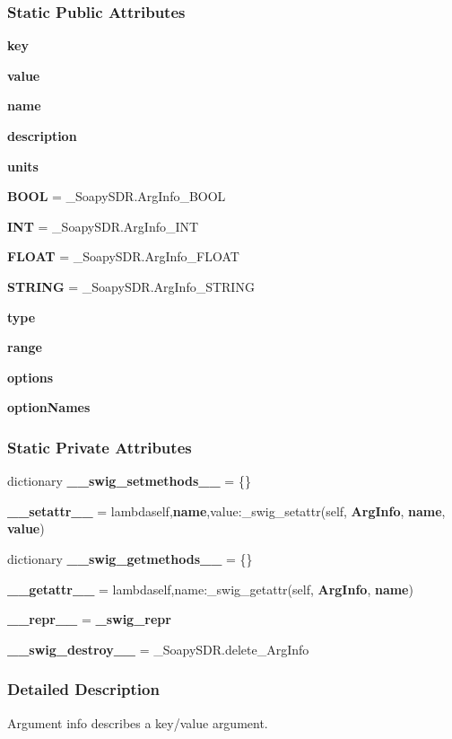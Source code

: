 \subsubsection*{Static Public Attributes}
\begin{DoxyCompactItemize}
\item 
{\bf key}
\item 
{\bf value}
\item 
{\bf name}
\item 
{\bf description}
\item 
{\bf units}
\item 
{\bf B\+O\+OL} = \+\_\+\+Soapy\+S\+D\+R.\+Arg\+Info\+\_\+\+B\+O\+OL
\item 
{\bf I\+NT} = \+\_\+\+Soapy\+S\+D\+R.\+Arg\+Info\+\_\+\+I\+NT
\item 
{\bf F\+L\+O\+AT} = \+\_\+\+Soapy\+S\+D\+R.\+Arg\+Info\+\_\+\+F\+L\+O\+AT
\item 
{\bf S\+T\+R\+I\+NG} = \+\_\+\+Soapy\+S\+D\+R.\+Arg\+Info\+\_\+\+S\+T\+R\+I\+NG
\item 
{\bf type}
\item 
{\bf range}
\item 
{\bf options}
\item 
{\bf option\+Names}
\end{DoxyCompactItemize}
\subsubsection*{Static Private Attributes}
\begin{DoxyCompactItemize}
\item 
dictionary {\bf \+\_\+\+\_\+swig\+\_\+setmethods\+\_\+\+\_\+} = \{\}
\item 
{\bf \+\_\+\+\_\+setattr\+\_\+\+\_\+} = lambdaself,{\bf name},value\+:\+\_\+swig\+\_\+setattr(self, {\bf Arg\+Info}, {\bf name}, {\bf value})
\item 
dictionary {\bf \+\_\+\+\_\+swig\+\_\+getmethods\+\_\+\+\_\+} = \{\}
\item 
{\bf \+\_\+\+\_\+getattr\+\_\+\+\_\+} = lambdaself,name\+:\+\_\+swig\+\_\+getattr(self, {\bf Arg\+Info}, {\bf name})
\item 
{\bf \+\_\+\+\_\+repr\+\_\+\+\_\+} = {\bf \+\_\+swig\+\_\+repr}
\item 
{\bf \+\_\+\+\_\+swig\+\_\+destroy\+\_\+\+\_\+} = \+\_\+\+Soapy\+S\+D\+R.\+delete\+\_\+\+Arg\+Info
\end{DoxyCompactItemize}


\subsubsection{Detailed Description}
Argument info describes a key/value argument. 

